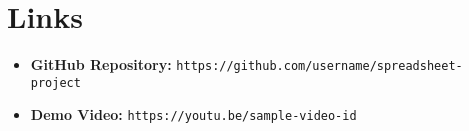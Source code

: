 \documentclass[12pt,letterpaper,onecolumn]{exam}
\begin{document}
\section{Links}

\begin{itemize}
    \item \textbf{GitHub Repository:} \texttt{https://github.com/username/spreadsheet-project} 
    \item \textbf{Demo Video:} \texttt{https://youtu.be/sample-video-id} 
\end{itemize}

\pagestyle{plain}
\end{document}
